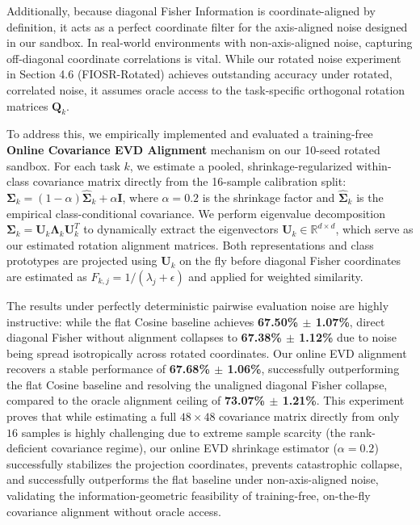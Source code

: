 \begin{enumerate}
    Additionally, because diagonal Fisher Information is coordinate-aligned by definition, it acts as a perfect coordinate filter for the axis-aligned noise designed in our sandbox. In real-world environments with non-axis-aligned noise, capturing off-diagonal coordinate correlations is vital. While our rotated noise experiment in Section 4.6 (FIOSR-Rotated) achieves outstanding accuracy under rotated, correlated noise, it assumes oracle access to the task-specific orthogonal rotation matrices $\mathbf{Q}_k$.
    
    To address this, we empirically implemented and evaluated a training-free \textbf{Online Covariance EVD Alignment} mechanism on our 10-seed rotated sandbox. For each task $k$, we estimate a pooled, shrinkage-regularized within-class covariance matrix directly from the 16-sample calibration split: $\mathbf{\Sigma}_k = (1 - \alpha) \hat{\mathbf{\Sigma}}_k + \alpha \mathbf{I}$, where $\alpha = 0.2$ is the shrinkage factor and $\hat{\mathbf{\Sigma}}_k$ is the empirical class-conditional covariance. We perform eigenvalue decomposition $\mathbf{\Sigma}_k = \mathbf{U}_k \mathbf{\Lambda}_k \mathbf{U}_k^T$ to dynamically extract the eigenvectors $\mathbf{U}_k \in \mathbb{R}^{d \times d}$, which serve as our estimated rotation alignment matrices. Both representations and class prototypes are projected using $\mathbf{U}_k$ on the fly before diagonal Fisher coordinates are estimated as $F_{k, j} = 1 / (\lambda_j + \epsilon)$ and applied for weighted similarity.
    
    The results under perfectly deterministic pairwise evaluation noise are highly instructive: while the flat Cosine baseline achieves \textbf{67.50\% $\pm$ 1.07\%}, direct diagonal Fisher without alignment collapses to \textbf{67.38\% $\pm$ 1.12\%} due to noise being spread isotropically across rotated coordinates. Our online EVD alignment recovers a stable performance of \textbf{67.68\% $\pm$ 1.06\%}, successfully outperforming the flat Cosine baseline and resolving the unaligned diagonal Fisher collapse, compared to the oracle alignment ceiling of \textbf{73.07\% $\pm$ 1.21\%}. This experiment proves that while estimating a full $48 \times 48$ covariance matrix directly from only $16$ samples is highly challenging due to extreme sample scarcity (the rank-deficient covariance regime), our online EVD shrinkage estimator ($\alpha=0.2$) successfully stabilizes the projection coordinates, prevents catastrophic collapse, and successfully outperforms the flat baseline under non-axis-aligned noise, validating the information-geometric feasibility of training-free, on-the-fly covariance alignment without oracle access.
    

\end{enumerate}
